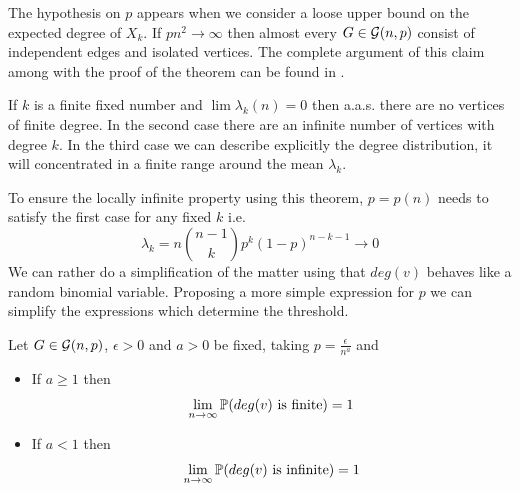 The hypothesis on $p$ appears when we consider a loose upper bound on the expected degree of $X_ {k}$. If $pn^{2} \to \infty $ then almost every $ G \in \G (n, p) $ consist of independent edges and isolated vertices. The complete argument of this claim among with the proof of the theorem can be found in \cite[Bollobás, p.~61]{Bollobas}.

If $k$ is a finite fixed number and $\lim \lambda_{k}(n) = 0$ then a.a.s. there are no vertices of finite degree. In the second case there are an infinite number of vertices with degree $k$. In the third case we can describe explicitly the degree distribution, it will concentrated in a finite range around the mean $\lambda_{k}$. 

To ensure the locally infinite property using this theorem, $p = p(n)$ needs to satisfy the first case for any fixed $k$ i.e.
$$\lambda_{k} = n \binom{n-1}{k} p^{k} (1-p)^{n-k-1} \to 0$$
We can rather do a simplification of the matter using that $deg(v)$ behaves like a random binomial variable. Proposing a more simple expression for $p$ we can simplify the expressions which determine the threshold. 
\begin{theorem}\label{conectivityRCC}
Let $G \in \G(n,p)$, $\epsilon>0$ and $a>0$ be fixed, taking $p=\frac{\epsilon}{n^{a}}$ and 
\begin{itemize}
    \item If $a\geq 1$ then 
    $$\lim_{n \to \infty} \P(deg(v) \text{ is finite}) = 1$$
    \item If $a<1$ then
     $$\lim_{n \to \infty} \P(deg(v) \text{ is infinite}) = 1$$
\end{itemize}
\end{theorem}

